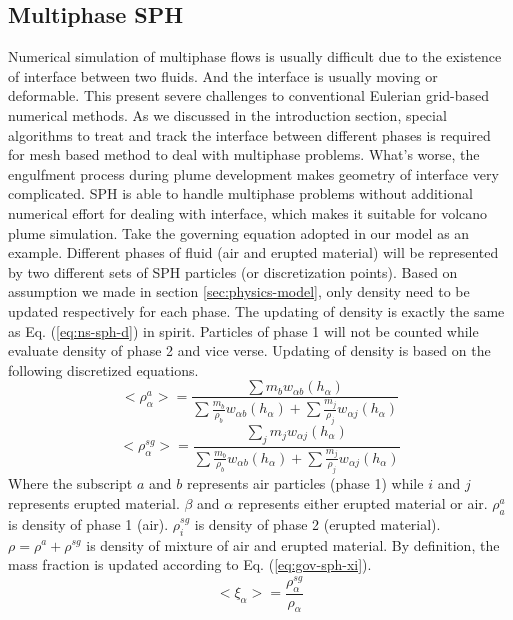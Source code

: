 \documentclass[journal abbreviation, manuscript]{copernicus}
\begin{document}
\subsection{Multiphase SPH}
Numerical simulation of multiphase flows is usually difficult due to the existence of interface between two fluids. And the interface is usually moving or deformable. This present severe challenges to conventional Eulerian grid-based numerical methods. As we discussed in the introduction section, special algorithms to treat and track the interface between different phases is required for mesh based method to deal with multiphase problems. What's worse, the engulfment process during plume development makes geometry of interface very complicated. SPH is able to handle multiphase problems without additional numerical effort for dealing with interface, which makes it suitable for volcano plume simulation. Take the governing equation adopted in our model as an example. Different phases of fluid (air and erupted material) will be represented by two different sets of SPH particles (or discretization points). Based on assumption we made in section \ref{sec:physics-model}, only density need to be updated respectively for each phase. The updating of density is exactly the same as Eq. (\ref{eq:ns-sph-d}) in spirit.  Particles of phase 1 will not be counted while evaluate density of phase 2 and vice verse. Updating of density is based on the following discretized equations.
\begin{equation}
<\rho_{\alpha}^a>=\frac{\sum m_b w_{\alpha b} (h_{\alpha})}{\sum \frac{m_b}{\rho_b} w_{\alpha b} (h_{\alpha}) +\sum \frac{m_j}{\rho_j} w_{\alpha j} (h_{\alpha})} \label{eq:gov-sph-d1}
\end{equation}
\begin{equation}
<\rho_\alpha^{sg}>=\frac{\sum_j m_j w_{\alpha j} (h_\alpha)}{\sum \frac{m_b}{\rho_b} w_{\alpha b} (h_{\alpha}) +\sum \frac{m_j}{\rho_j} w_{\alpha j} (h_{\alpha})} \label{eq:gov-sph-d2}
\end{equation}
Where the subscript $a$ and $b$ represents air particles (phase 1) while $i$ and $j$ represents erupted material. $\beta$ and $\alpha$ represents either erupted material or air.
$\rho_a^a$ is density of phase 1 (air). 
 $\rho_i^{sg}$ is density of phase 2 (erupted material).
$\rho=\rho^a + \rho^{sg}$ is density of mixture of air and erupted material. By definition, the mass fraction is updated according to Eq. (\ref{eq:gov-sph-xi}).
\begin{equation}
<\xi_{\alpha}> = \dfrac{\rho^{sg}_{\alpha}}{\rho_{\alpha}}
\label{eq:gov-sph-xi}
\end{equation}
\end{document}
